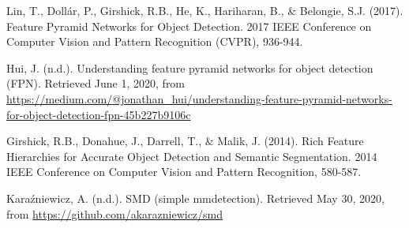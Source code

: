 \begin{thebibliography}{9}

Lin, T., Dollár, P., Girshick, R.B., He, K., Hariharan, B., \& Belongie, S.J. (2017).
Feature Pyramid Networks for Object Detection.
2017 IEEE Conference on Computer Vision and Pattern Recognition (CVPR), 936-944.

Hui, J. (n.d.).
Understanding feature pyramid networks for object detection (FPN).
Retrieved June 1, 2020, from \url{https://medium.com/@jonathan_hui/understanding-feature-pyramid-networks-for-object-detection-fpn-45b227b9106c}

Girshick, R.B., Donahue, J., Darrell, T., \& Malik, J. (2014).
Rich Feature Hierarchies for Accurate Object Detection and Semantic Segmentation.
2014 IEEE Conference on Computer Vision and Pattern Recognition, 580-587.

Karaźniewicz, A. (n.d.).
SMD (simple mmdetection).
Retrieved May 30, 2020, from \url{https://github.com/akarazniewicz/smd}

\end{thebibliography}